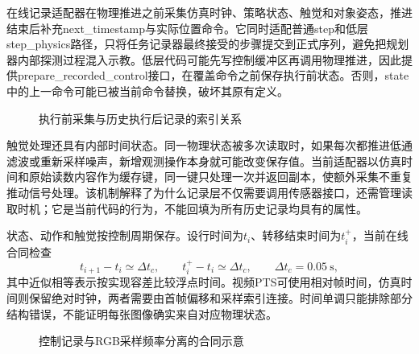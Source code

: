 在线记录适配器在物理推进之前采集仿真时钟、策略状态、触觉和对象姿态，推进结束后补充next\_timestamp与实际位置命令。它同时适配普通step和低层step\_physics路径，只将任务记录器最终接受的步骤提交到正式序列，避免把规划器内部探测过程混入示教。低层代码可能先写控制缓冲区再调用物理推进，因此提供prepare\_recorded\_control接口，在覆盖命令之前保存执行前状态。否则，state中的上一命令可能已被当前命令替换，破坏其原有定义。

\begin{figure}[htbp]
 \centering
 \caption{执行前采集与历史执行后记录的索引关系}
 \label{fig:ch04_timing}
\end{figure}

触觉处理还具有内部时间状态。同一物理状态被多次读取时，如果每次都推进低通滤波或重新采样噪声，新增观测操作本身就可能改变保存值。当前适配器以仿真时间和原始读数内容作为缓存键，同一键只处理一次并返回副本，使额外采集不重复推动信号处理。该机制解释了为什么记录层不仅需要调用传感器接口，还需管理读取时机；它是当前代码的行为，不能回填为所有历史记录均具有的属性。

状态、动作和触觉按控制周期保存。设行时间为$t_i$、转移结束时间为$t_i^{+}$，当前在线合同检查
\begin{equation}
 t_{i+1}-t_i\simeq\Delta t_c,\qquad
 t_i^{+}-t_i\simeq\Delta t_c,\qquad \Delta t_c=0.05~\mathrm{s},
 \label{eq:ch04_time_interval}
\end{equation}
其中近似相等表示按实现容差比较浮点时间。视频PTS可使用相对帧时间，仿真时间则保留绝对时钟，两者需要由首帧偏移和采样索引连接。时间单调只能排除部分结构错误，不能证明每张图像确实来自对应物理状态。

\begin{figure}[htbp]
 \centering
 \caption{控制记录与RGB采样频率分离的合同示意}
 \label{fig:ch04_multirate}
\end{figure}

